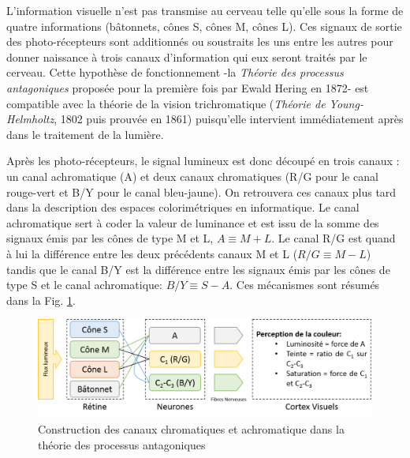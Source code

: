 	\par L'information visuelle n'est pas transmise au cerveau telle qu'elle sous la forme de quatre informations (bâtonnets, cônes S, cônes M, cônes L). Ces signaux de sortie des photo-récepteurs sont additionnés ou soustraits les uns entre les autres pour donner naissance à trois canaux d'information qui eux seront traités par le cerveau. Cette hypothèse de fonctionnement  -la \textit{Théorie des processus antagoniques} proposée pour la première fois par Ewald Hering en 1872- est compatible avec la théorie de la vision trichromatique (\textit{Théorie de Young-Helmholtz}, 1802 puis prouvée en 1861) puisqu'elle intervient immédiatement après dans le traitement de la lumière.
	
	\par Après les photo-récepteurs, le signal lumineux est donc découpé en trois canaux \citep{glassner_principles_1995,winkler_issues_1999}: un canal achromatique (A) et deux canaux chromatiques (R/G pour le canal rouge-vert et B/Y pour le canal bleu-jaune). On retrouvera ces canaux plus tard dans la description des espaces colorimétriques en informatique. Le canal achromatique sert à coder la valeur de luminance et est issu de la somme des signaux émis par les cônes de type M et L, $A \equiv M + L$. Le canal R/G est quand à lui la différence entre les deux précédents canaux M et L ($R/G \equiv M - L$) tandis que le canal B/Y est la différence entre les signaux émis par les cônes de type S et le canal achromatique: $B/Y \equiv S - A$. Ces mécanismes sont résumés dans la Fig. \ref{fig:opponent_colors_theory}.
	
	\begin{figure}
		\centering
		\includegraphics[scale=.6]{Figures/OpponentColorsTheory}
		\caption{Construction des canaux chromatiques et achromatique dans la théorie des processus antagoniques}
		\label{fig:opponent_colors_theory}
	\end{figure}
	
